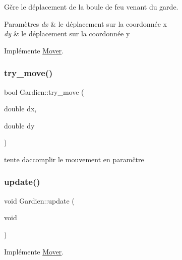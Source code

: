 Gčre le déplacement de la boule de feu venant du garde. 


\begin{DoxyParams}{Paramètres}
{\em dx} & le déplacement sur la coordonnée x \\
\hline
{\em dy} & le déplacement sur la coordonnée y \\
\hline
\end{DoxyParams}


Implémente \hyperlink{classMover_a6d794056f34e2348d32ae4ff49326070}{Mover}.

\mbox{\label{classGardien_a851adaf99e906da7469567829893b8f4}} 
\subsubsection{\texorpdfstring{try\+\_\+move()}{try\_move()}}
{\footnotesize\ttfamily bool Gardien\+::try\+\_\+move (\begin{DoxyParamCaption}\item[{double}]{dx,  }\item[{double}]{dy }\end{DoxyParamCaption})\hspace{0.3cm}{\ttfamily [private]}}



tente d\textquotesingle{}accomplir le mouvement en paramčtre 

\mbox{\label{classGardien_aed498f0d6bbb526e0373a914ba6bf9aa}} 
\subsubsection{\texorpdfstring{update()}{update()}}
{\footnotesize\ttfamily void Gardien\+::update (\begin{DoxyParamCaption}\item[{void}]{ }\end{DoxyParamCaption})\hspace{0.3cm}{\ttfamily [virtual]}}



Implémente \hyperlink{classMover_a77684ae3483af98c82c9488ef3e80f05}{Mover}.

\mbox{\label{classGardien_ae4f3ed71c1b37ed1e6c3b39ffd16d3fa}} 
